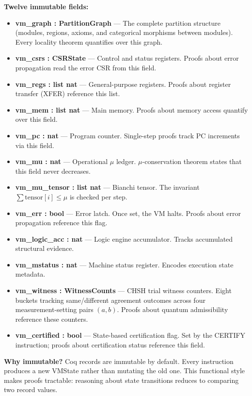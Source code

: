 \textbf{Twelve immutable fields:}
\begin{itemize}
    \item \textbf{vm\_graph : PartitionGraph} — The complete partition structure (modules, regions, axioms, and categorical morphisms between modules). Every locality theorem quantifies over this graph.
    \item \textbf{vm\_csrs : CSRState} — Control and status registers. Proofs about error propagation read the error CSR from this field.
    \item \textbf{vm\_regs : list nat} — General-purpose registers. Proofs about register transfer (XFER) reference this list.
    \item \textbf{vm\_mem : list nat} — Main memory. Proofs about memory access quantify over this field.
    \item \textbf{vm\_pc : nat} — Program counter. Single-step proofs track PC increments via this field.
    \item \textbf{vm\_mu : nat} — Operational $\mu$ ledger. $\mu$-conservation theorem states that this field never decreases.
    \item \textbf{vm\_mu\_tensor : list nat} — Bianchi tensor. The invariant $\sum\text{tensor}[i] \le \mu$ is checked per step.
    \item \textbf{vm\_err : bool} — Error latch. Once set, the VM halts. Proofs about error propagation reference this flag.
    \item \textbf{vm\_logic\_acc : nat} — Logic engine accumulator. Tracks accumulated structural evidence.
    \item \textbf{vm\_mstatus : nat} — Machine status register. Encodes execution state metadata.
    \item \textbf{vm\_witness : WitnessCounts} — CHSH trial witness counters. Eight buckets tracking same/different agreement outcomes across four measurement-setting pairs $(a,b)$. Proofs about quantum admissibility reference these counters.
    \item \textbf{vm\_certified : bool} — State-based certification flag. Set by the CERTIFY instruction; proofs about certification status reference this field.
\end{itemize}

\textbf{Why immutable?} Coq records are immutable by default. Every instruction produces a new VMState rather than mutating the old one. This functional style makes proofs tractable: reasoning about state transitions reduces to comparing two record values.

